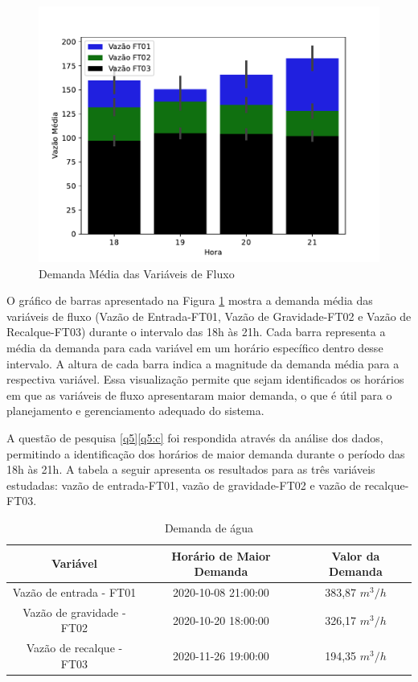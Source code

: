 \begin{figure}[htp!]
	\centering
	\caption{Demanda Média das Variáveis de Fluxo}
	\includegraphics[width=0.9\linewidth]{Resultados/Figuras/grafico-barras-demanda}
	
	\label{fig:grafico-barras-demanda}
	
\end{figure}

O gráfico de barras apresentado na Figura \ref{fig:grafico-barras-demanda} mostra a demanda média das variáveis de fluxo (Vazão de Entrada-FT01, Vazão de Gravidade-FT02 e Vazão de Recalque-FT03) durante o intervalo das 18h às 21h. Cada barra representa a média da demanda para cada variável em um horário específico dentro desse intervalo. A altura de cada barra indica a magnitude da demanda média para a respectiva variável. Essa visualização permite que sejam identificados os horários em que as variáveis de fluxo apresentaram maior demanda, o que é útil para o planejamento e gerenciamento adequado do sistema.

A questão de pesquisa \ref{q5}\ref{q5:c} foi respondida através da análise dos dados, permitindo a identificação dos horários de maior demanda durante o período das 18h às 21h. A tabela a seguir apresenta os resultados para as três variáveis estudadas: vazão de entrada-FT01, vazão de gravidade-FT02 e vazão de recalque-FT03.

\begin{table}[htp!]
	\centering
	\caption{Demanda de água}\label{tb:dem}
	\begin{tabular}{@{}ccc@{}}
		\toprule
		\textbf{Variável}         & \textbf{Horário de Maior Demanda} & \textbf{Valor da Demanda} \\ \midrule
		Vazão de entrada - FT01   & 2020-10-08 21:00:00               & 383,87 $m^3/h$                   \\
		Vazão de gravidade - FT02 & 2020-10-20 18:00:00               & 326,17 $m^3/h$                    \\
		Vazão de recalque - FT03  & 2020-11-26 19:00:00               & 194,35 $m^3/h$                    \\ \bottomrule
	\end{tabular}
	
	
\end{table}

